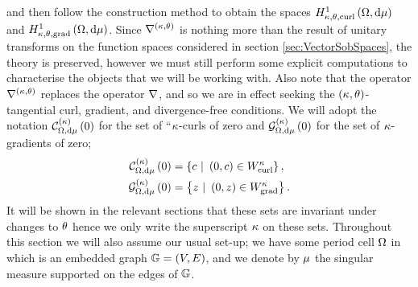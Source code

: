 and then follow the construction method to obtain the spaces $H^1_{\kappa,\theta,\mathrm{curl}}\left( \Omega, \mathrm{d}\mu \right)$ and $H^1_{\kappa,\theta,\mathrm{grad}}\left( \Omega, \mathrm{d}\mu \right)$.
Since $\nabla^{\left( \kappa, \theta \right)}$ is nothing more than the result of unitary transforms on the function spaces considered in section \ref{sec:VectorSobSpaces}, the theory is preserved, however we must still perform some explicit computations to characterise the objects that we will be working with.
Also note that the operator $\nabla^{\left( \kappa, \theta \right)}$ replaces the operator $\nabla$, and so we are in effect seeking the $\left( \kappa,\theta \right)$-tangential curl, gradient, and divergence-free conditions. 
We will adopt the notation $\mathcal{C}_{ \Omega, \mathrm{d}\mu}^{(\kappa)}\left( 0 \right)$ for the set of ``$\kappa$-curls of zero and $\mathcal{G}_{ \Omega, \mathrm{d}\mu}^{(\kappa)}\left( 0 \right)$ for the set of $\kappa$-gradients of zero;
\begin{align*}
	\kcurlZero{\ddom}{\ddmes} &= \clbracs{ c \ \vert \ \bracs{0,c}\in W^{\wavenumber}_{\mathrm{curl}}}, \\
	\kgradZero{\ddom}{\ddmes} &= \clbracs{ z \ \vert \ \bracs{0,z}\in W^{\wavenumber}_{\mathrm{grad}}}.
\end{align*}
It will be shown in the relevant sections that these sets are invariant under changes to $\theta$ hence we only write the superscript $\kappa$ on these sets.
Throughout this section we will also assume our usual set-up; we have some period cell $\Omega$ in which is an embedded graph $\mathbb{G}=\left( V,E \right)$, and we denote by $\mu$ the singular measure supported on the edges of $\mathbb{G}$.

